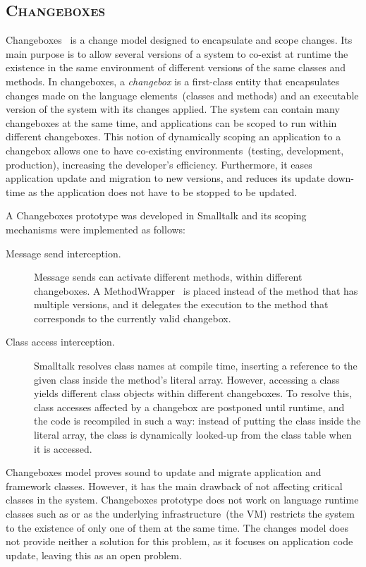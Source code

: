 \subsection*{\textsc{Changeboxes}}

Changeboxes~\cite{Denk07c} is a change model designed to encapsulate and scope changes. Its main purpose is to allow several versions of a system to co-exist at runtime \ie the existence in the same environment of different versions of the same classes and methods. In changeboxes, a \emph{changebox} is a first-class entity that encapsulates changes made on the language elements~(\eg classes and methods) and an executable version of the system with its changes applied. The system can contain many changeboxes at the same time, and applications can be scoped to run within different changeboxes. This notion of dynamically scoping an application to a changebox allows one to have co-existing environments~(\eg testing, development, production), increasing the developer's efficiency. Furthermore, it eases application update and migration to new versions, and reduces its update down-time as the application does not have to be stopped to be updated.

A Changeboxes prototype was developed in Smalltalk and its scoping mechanisms were implemented as follows:

\begin{description}
\item[Message send interception.] Message sends can activate different methods, within different changeboxes. A MethodWrapper~\cite{Bran98a} is placed instead of the method that has multiple versions, and it delegates the execution to the method that corresponds to the currently valid changebox.

\item[Class access interception.] Smalltalk resolves class names at compile time, inserting a reference to the given class inside the method's literal array. However, accessing a class yields different class objects within different changeboxes. To resolve this, class accesses affected by a changebox are postponed until runtime, and the code is recompiled in such a way: instead of putting the class inside the literal array, the class is dynamically looked-up from the class table when it is accessed.
\end{description}

Changeboxes model proves sound to update and migrate application and framework classes. However, it has the main drawback of not affecting critical classes in the system. Changeboxes prototype does not work on language runtime classes such as  or  as the underlying infrastructure~(the VM) restricts the system to the existence of only one of them at the same time. The changes model does not provide neither a solution for this problem, as it focuses on application code update, leaving this as an open problem.

